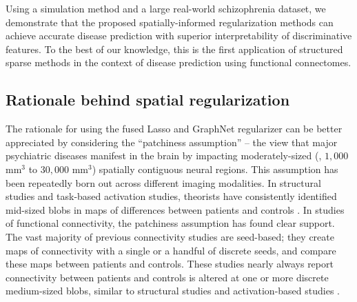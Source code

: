 Using a simulation method and a large real-world schizophrenia dataset, we demonstrate that the proposed spatially-informed regularization methods can achieve accurate disease prediction with superior interpretability of discriminative features.
To the best of our knowledge, this is the first application of structured sparse methods in the context of disease prediction using functional connectomes.

\subsection{Rationale behind spatial regularization}
\label{subsec:why,flasso}
The rationale for using the fused Lasso and GraphNet regularizer can be better appreciated by considering the ``patchiness assumption'' -- the view that major psychiatric diseases manifest in the brain by impacting moderately-sized (\eg, $1,000$ mm$^3$ to $30,000$ mm$^3$) spatially contiguous neural regions. 
This assumption has been repeatedly born out across different imaging modalities.
In structural studies and task-based activation studies, theorists have consistently identified mid-sized blobs in maps of differences between patients and controls \citep{Dickstein:2006, Glahn:2005, Wright:2000}.
In studies of functional connectivity, the patchiness assumption has found clear support. 
The vast majority of previous connectivity studies are seed-based; they create maps of connectivity with a single or a handful of discrete seeds, and compare these maps between patients and controls. 
These studies nearly always report connectivity between patients and controls is altered at one or more discrete medium-sized blobs, similar to structural studies and activation-based studies \citep{Heuvelemail:2010, Konrad:2010,Etkin:2007}.

